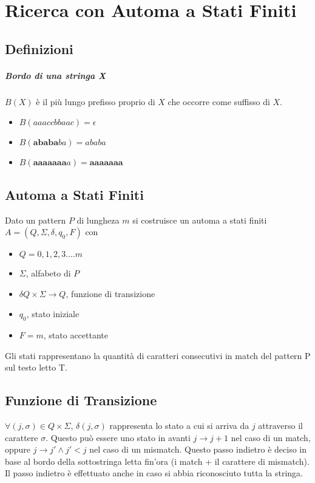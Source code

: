 \chapter{Ricerca con Automa a Stati Finiti}

\section{Definizioni}

\paragraph{Bordo di una stringa X} $B(X)$ \`e il pi\`u lungo prefisso proprio di $X$ che occorre come suffisso di $X$.

\begin{itemize}
    \item $B(aaaccbbaac) = \epsilon$
    \item $B(\textbf{ababa}ba) = ababa$
    \item $B(\textbf{aaaaaaa}a) = \textbf{aaaaaaa}$
\end{itemize}

\section{Automa a Stati Finiti}

Dato un pattern $P$ di lungheza $m$ si costruisce un automa a stati finiti $A = (Q, \Sigma, \delta, q_0, F)$ con

\begin{itemize}
    \item $Q = {0,1,2,3....m}$
    \item $\Sigma$, alfabeto di $P$
    \item $\delta Q \times \Sigma \rightarrow Q$, funzione di transizione 
    \item $q_0$, stato iniziale
    \item $F = {m}$, stato accettante
\end{itemize}

Gli stati rappresentano la quantit\`a di caratteri consecutivi in match del pattern P sul testo letto T.

\section{Funzione di Transizione}

$\forall (j, \sigma) \in Q \times \Sigma$, $\delta(j, \sigma)$ rappresenta lo stato a cui si arriva da $j$ attraverso il carattere $\sigma$. Questo pu\`o essere uno stato in avanti $j \rightarrow j+1$ nel caso di un match, oppure $j \rightarrow j' \land j' < j$ nel caso di un mismatch. Questo passo indietro \`e deciso in base al bordo della sottostringa letta fin'ora (i match + il carattere di mismatch). Il passo indietro \`e effettuato anche in caso si abbia riconosciuto tutta la stringa.

